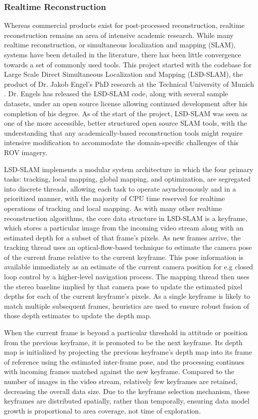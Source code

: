 \documentclass[letterpaper,12pt]{article}
\begin{document}
\subsubsection{Realtime Reconstruction}

Whereas commercial products exist for post-processed reconstruction, realtime reconstruction remains an area of intensive academic research.   While many realtime reconstruction, or simultaneous localization and mapping (SLAM), systems have been detailed in the literature, there has been little convergence towards a set of commonly used tools.   This project started with the codebase for Large Scale Direct Simultaneous Localization and Mapping (LSD-SLAM), the product of Dr. Jakob Engel's PhD research at the Technical University of Munich \cite{engel2014lsd}.   Dr. Engels has released the LSD-SLAM code, along with several sample datasets, under an open source license allowing continued development after his completion of his degree.   As of the start of the project, LSD-SLAM was seen as one of the more accessible, better structured open source SLAM tools, with the understanding that any academically-based reconstruction tools might require intensive modification to accommodate the domain-specific challenges of this ROV imagery.

LSD-SLAM implements a modular system architecture in which the four primary tasks: tracking, local mapping, global mapping, and optimization, are segregated into discrete threads, allowing each task to operate asynchronously and in a prioritized manner, with the majority of CPU time reserved for realtime operations of tracking and local mapping.   As with many other realtime reconstruction algorithms, the core data structure in LSD-SLAM is a keyframe, which stores a particular image from the incoming video stream along with an estimated depth for a subset of that frame's pixels.   As new frames arrive, the tracking thread uses an optical-flow-based technique to estimate the camera pose of the current frame relative to the current keyframe.  This pose information is available immediately as an estimate of the current camera position for e.g closed loop control by a higher-level navigation process.  The mapping thread then uses the stereo baseline implied by that camera pose to update the estimated pixel depths for each of the current keyframe's pixels.   As a single keyframe is likely to match multiple subsequent frames, heuristics are used to ensure robust fusion of those depth estimates to update the depth map.

When the current frame is beyond a particular threshold in attitude or position from the previous keyframe, it is promoted to be the next keyframe.  Its depth map is initialized by projecting the previous keyframe's depth map into its frame of reference using the estimated inter-frame pose, and the processing continues with incoming frames matched against the new keyframe.  Compared to the number of images in the video stream, relatively few keyframes are retained, decreasing the overall data size.   Due to the keyframe selection mechanism, these keyframes are distributed spatially, rather than temporally, ensuring data model growth is proportional to area coverage, not time of exploration. 
\end{document}
